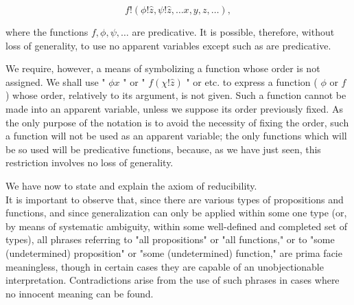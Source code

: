 \documentclass[10pt]{article}
\begin{document}
$$
f!(\phi!\hat{z}, \psi!\hat{z}, \ldots x, y, z, \ldots),
$$

where the functions $f, \phi, \psi, \ldots$ are predicative. It is possible, therefore, without loss of generality, to use no apparent variables except such as are predicative.

We require, however, a means of symbolizing a function whose order is not assigned. We shall use " $\phi x$ " or " $f(\chi!\hat{z})$ " or etc. to express a function ( $\phi$ or $f$ ) whose order, relatively to its argument, is not given. Such a function cannot be made into an apparent variable, unless we suppose its order previously fixed. As the only purpose of the notation is to avoid the necessity of fixing the order, such a function will not be used as an apparent variable; the only functions which will be so used will be predicative functions, because, as we have just seen, this restriction involves no loss of generality.

We have now to state and explain the axiom of reducibility.\\
It is important to observe that, since there are various types of propositions and functions, and since generalization can only be applied within some one type (or, by means of systematic ambiguity, within some well-defined and completed set of types), all phrases referring to "all propositions" or "all functions," or to "some (undetermined) proposition" or "some (undetermined) function," are prima facie meaningless, though in certain cases they are capable of an unobjectionable interpretation. Contradictions arise from the use of such phrases in cases where no innocent meaning can be found.
\end{document}
